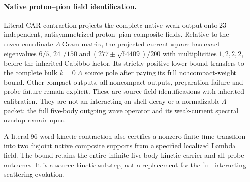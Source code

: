 \paragraph{Native proton--pion field identification.}
Literal CAR contraction projects the complete native weak output onto
23 independent, antisymmetrized proton--pion composite fields. Relative
to the seven-coordinate $\Lambda$ Gram matrix, the projected-current
square has exact eigenvalues
$6/5$, $241/150$ and $(277\pm\sqrt{54409})/200$
with multiplicities $1,2,2,2$, before the inherited Cabibbo factor.
Its strictly positive lower bound transfers to the complete bulk
$k=0$ $\Lambda$ source pole after paying its full noncompact-weight
bound. Other compact outputs, all noncompact outputs, preparation
failure and probe failure remain explicit. These are source field
identifications with inherited calibration. They are not an interacting
on-shell decay or a normalizable $\Lambda$ packet: the full five-body
outgoing wave operator and its weak-current spectral overlap remain open.

A literal 96-word kinetic contraction also certifies a nonzero finite-time
transition into two disjoint native composite supports from a specified
localized Lambda field. The bound retains the entire infinite five-body
kinetic carrier and all probe outcomes. It is a source kinetic substep,
not a replacement for the full interacting scattering evolution.
